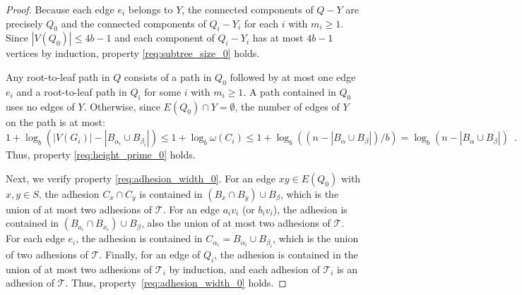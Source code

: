\documentclass{patmorin}
\renewcommand{\ge}{\geqslant}
\renewcommand{\le}{\leqslant}
\newcommand{\calT}{\mathcal{T}}
\begin{document}
\begin{proof}
  Because each edge $e_i$ belongs to $Y$, the connected components of $Q-Y$ are precisely $Q_0$ and the connected components of $Q_i-Y_i$ for each $i$ with $m_i\ge 1$.  Since $|V(Q_0)|\le 4b-1$ and each component of $Q_i-Y_i$ has at most $4b-1$ vertices by induction, property \ref{req:subtree_size_0} holds.

  Any root-to-leaf path in $Q$ consists of a path in $Q_0$ followed by at most one edge $e_i$ and a root-to-leaf path in $Q_i$ for some $i$ with $m_i\ge 1$.  A path contained in $Q_0$ uses no edges of $Y$. Otherwise, since $E(Q_0)\cap Y=\emptyset$, the number of edges of $Y$ on the path is at most:
  \[
    1 + \log_b(|V(G_i)| - |B_{\alpha_i}\cup B_{\beta_i}|) \le 1 + \log_b\omega(C_i) \le 1 + \log_b((n-|B_\alpha\cup B_\beta|)/b) = \log_b(n-|B_\alpha\cup B_\beta|) \enspace .
  \]
  Thus, property \ref{req:height_prime_0} holds.

  Next, we verify property \ref{req:adhesion_width_0}. For an edge $xy\in E(Q_0)$ with $x,y\in S$, the adhesion $C_x\cap C_y$ is contained in $(B_x\cap B_y)\cup B_\beta$, which is the union of at most two adhesions of $\calT$. For an edge $a_i v_i$ (or $b_i v_i$), the adhesion is contained in $(B_{a_i}\cap B_{x_i})\cup B_\beta$, also the union of at most two adhesions of $\calT$. For each edge $e_i$, the adhesion is contained in $C_{\alpha_i} = B_{\alpha_i}\cup B_{\beta_i}$, which is the union of two adhesions of $\calT$. Finally, for an edge of $Q_i$, the adhesion is contained in the union of at most two adhesions of $\calT_i$ by induction, and each adhesion of $\calT_i$ is an adhesion of $\calT$. Thus, property~\ref{req:adhesion_width_0} holds.


\end{proof}
\end{document}

